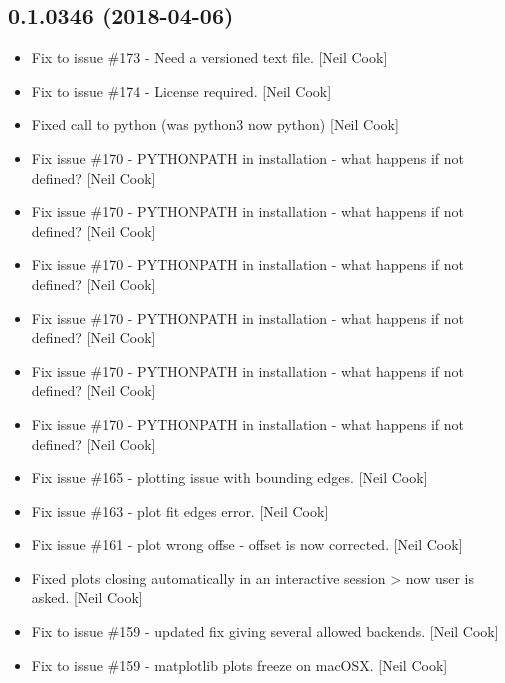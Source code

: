 \documentclass[a4paper,10pt,english]{report}
\begin{document}
\subsection{0.1.0346 (2018-04-06)}
\label{\detokenize{misc/changelog:id467}}\begin{itemize}
\item {} 
Fix to issue \#173 - Need a versioned text file. {[}Neil Cook{]}

\item {} 
Fix to issue \#174 - License required. {[}Neil Cook{]}

\item {} 
Fixed call to python (was python3 now python) {[}Neil Cook{]}

\item {} 
Fix issue \#170 - PYTHONPATH in installation - what happens if not
defined? {[}Neil Cook{]}

\item {} 
Fix issue \#170 - PYTHONPATH in installation - what happens if not
defined? {[}Neil Cook{]}

\item {} 
Fix issue \#170 - PYTHONPATH in installation - what happens if not
defined? {[}Neil Cook{]}

\item {} 
Fix issue \#170 - PYTHONPATH in installation - what happens if not
defined? {[}Neil Cook{]}

\item {} 
Fix issue \#170 - PYTHONPATH in installation - what happens if not
defined? {[}Neil Cook{]}

\item {} 
Fix issue \#170 - PYTHONPATH in installation - what happens if not
defined? {[}Neil Cook{]}

\item {} 
Fix issue \#165 -  plotting issue with bounding edges. {[}Neil
Cook{]}

\item {} 
Fix issue \#163 -  plot fit edges error. {[}Neil Cook{]}

\item {} 
Fix issue \#161 -  plot wrong offse - offset is now corrected.
{[}Neil Cook{]}

\item {} 
Fixed plots closing automatically in an interactive session \textendash{}\textgreater{} now
user is asked. {[}Neil Cook{]}

\item {} 
Fix to issue \#159 - updated fix giving several allowed backends. {[}Neil
Cook{]}

\item {} 
Fix to issue \#159 - matplotlib plots freeze on macOSX. {[}Neil Cook{]}

\end{itemize}
\end{document}
